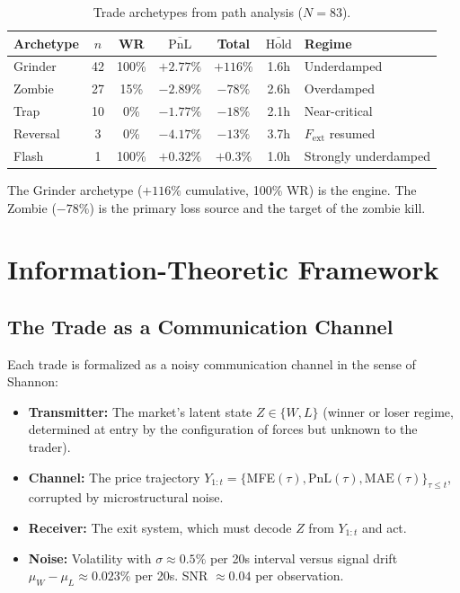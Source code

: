 \documentclass[11pt,a4paper]{article}
\newcommand{\Fext}{F_{\mathrm{ext}}}
\begin{document}
\begin{table}[H]
\centering
\caption{Trade archetypes from path analysis ($N=83$).}
\begin{tabular}{lcccccl}
\toprule
\textbf{Archetype} & $n$ & \textbf{WR} & $\bar{\text{PnL}}$ & \textbf{Total} & $\bar{\text{Hold}}$ & \textbf{Regime} \\
\midrule
Grinder & 42 & 100\% & $+2.77\%$ & $+116\%$ & 1.6h & Underdamped \\
Zombie & 27 & 15\% & $-2.89\%$ & $-78\%$ & 2.6h & Overdamped \\
Trap & 10 & 0\% & $-1.77\%$ & $-18\%$ & 2.1h & Near-critical \\
Reversal & 3 & 0\% & $-4.17\%$ & $-13\%$ & 3.7h & $\Fext$ resumed \\
Flash & 1 & 100\% & $+0.32\%$ & $+0.3\%$ & 1.0h & Strongly underdamped \\
\bottomrule
\end{tabular}
\end{table}

The Grinder archetype ($+116\%$ cumulative, 100\% WR) is the engine. The Zombie ($-78\%$) is the primary loss source and the target of the zombie kill.


\section{Information-Theoretic Framework}
\label{sec:shannon}

\subsection{The Trade as a Communication Channel}

Each trade is formalized as a noisy communication channel in the sense of Shannon:

\begin{itemize}[leftmargin=1.5em]
\item \textbf{Transmitter:} The market's latent state $Z \in \{W, L\}$ (winner or loser regime, determined at entry by the configuration of forces but unknown to the trader).
\item \textbf{Channel:} The price trajectory $Y_{1:t} = \{$MFE$(\tau), \text{PnL}(\tau), \text{MAE}(\tau)\}_{\tau \leq t}$, corrupted by microstructural noise.
\item \textbf{Receiver:} The exit system, which must decode $Z$ from $Y_{1:t}$ and act.
\item \textbf{Noise:} Volatility with $\sigma \approx 0.5\%$ per 20s interval versus signal drift $\mu_W - \mu_L \approx 0.023\%$ per 20s. SNR $\approx 0.04$ per observation.
\end{itemize}
\end{document}
